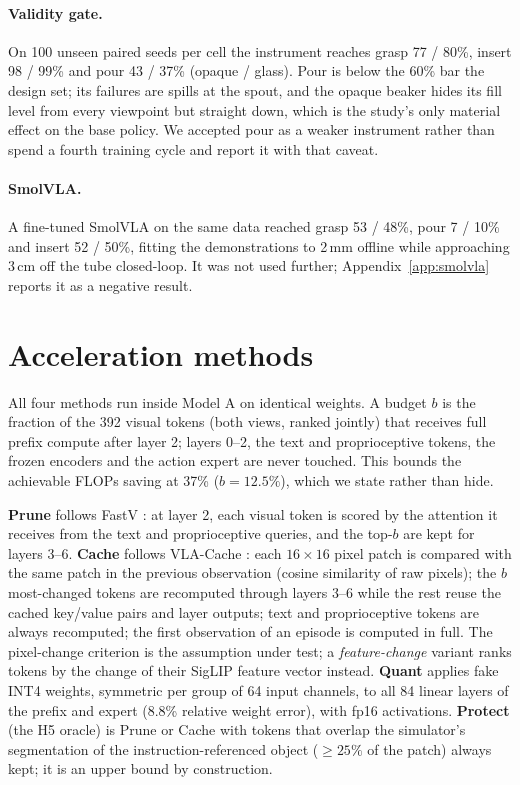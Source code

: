 \documentclass[11pt]{article}
\begin{document}
\paragraph{Validity gate.} On 100 unseen paired seeds per cell the instrument reaches grasp 77 / 80\%, insert 98 / 99\% and pour 43 / 37\% (opaque / glass). Pour is below the 60\% bar the design set; its failures are spills at the spout, and the opaque beaker hides its fill level from every viewpoint but straight down, which is the study's only material effect on the base policy. We accepted pour as a weaker instrument rather than spend a fourth training cycle and report it with that caveat.

\paragraph{SmolVLA.} A fine-tuned SmolVLA \citep{shukor2025smolvla} on the same data reached grasp 53 / 48\%, pour 7 / 10\% and insert 52 / 50\%, fitting the demonstrations to 2\,mm offline while approaching 3\,cm off the tube closed-loop. It was not used further; Appendix~\ref{app:smolvla} reports it as a negative result.

\section{Acceleration methods}
\label{sec:methods}

All four methods run inside Model A on identical weights. A budget $b$ is the fraction of the 392 visual tokens (both views, ranked jointly) that receives full prefix compute after layer 2; layers 0--2, the text and proprioceptive tokens, the frozen encoders and the action expert are never touched. This bounds the achievable FLOPs saving at 37\% ($b{=}12.5\%$), which we state rather than hide.

\textbf{Prune} follows FastV \citep{chen2024fastv}: at layer 2, each visual token is scored by the attention it receives from the text and proprioceptive queries, and the top-$b$ are kept for layers 3--6. \textbf{Cache} follows VLA-Cache \citep{xu2025vlacache}: each $16{\times}16$ pixel patch is compared with the same patch in the previous observation (cosine similarity of raw pixels); the $b$ most-changed tokens are recomputed through layers 3--6 while the rest reuse the cached key/value pairs and layer outputs; text and proprioceptive tokens are always recomputed; the first observation of an episode is computed in full. The pixel-change criterion is the assumption under test; a \emph{feature-change} variant ranks tokens by the change of their SigLIP feature vector instead. \textbf{Quant} applies fake INT4 weights, symmetric per group of 64 input channels, to all 84 linear layers of the prefix and expert (8.8\% relative weight error), with fp16 activations. \textbf{Protect} (the H5 oracle) is Prune or Cache with tokens that overlap the simulator's segmentation of the instruction-referenced object ($\geq 25\%$ of the patch) always kept; it is an upper bound by construction.
\end{document}
